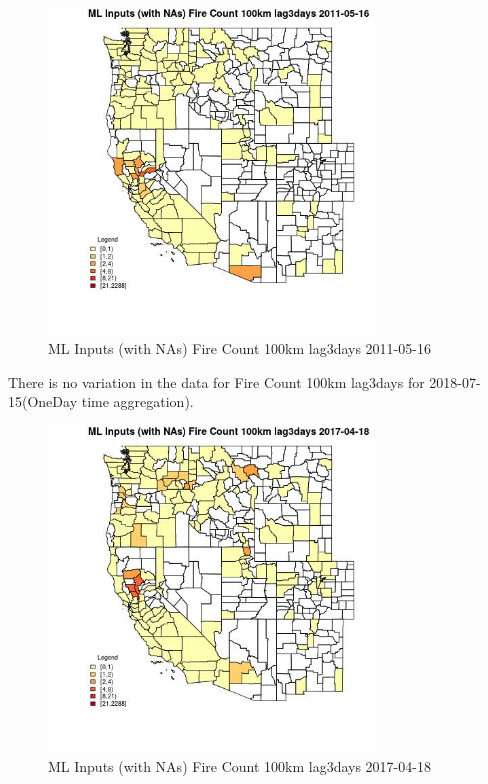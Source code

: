 \begin{figure} 
\centering  
\includegraphics[width=0.77\textwidth]{Code_Outputs/Report_ML_input_PM25_Step4_part_e_de_duplicated_aves_compiled_2019-05-21wNAs_CountyFire_Count_100km_lag3daysMean2011-05-16.jpg} 
\caption{\label{fig:Report_ML_input_PM25_Step4_part_e_de_duplicated_aves_compiled_2019-05-21wNAsCountyFire_Count_100km_lag3daysMean2011-05-16}ML Inputs (with NAs) Fire Count 100km lag3days 2011-05-16} 
\end{figure} 
 

There is no variation in the data for Fire Count 100km lag3days for 2018-07-15(OneDay time aggregation). 
 

\begin{figure} 
\centering  
\includegraphics[width=0.77\textwidth]{Code_Outputs/Report_ML_input_PM25_Step4_part_e_de_duplicated_aves_compiled_2019-05-21wNAs_CountyFire_Count_100km_lag3daysMean2017-04-18.jpg} 
\caption{\label{fig:Report_ML_input_PM25_Step4_part_e_de_duplicated_aves_compiled_2019-05-21wNAsCountyFire_Count_100km_lag3daysMean2017-04-18}ML Inputs (with NAs) Fire Count 100km lag3days 2017-04-18} 
\end{figure} 
 

